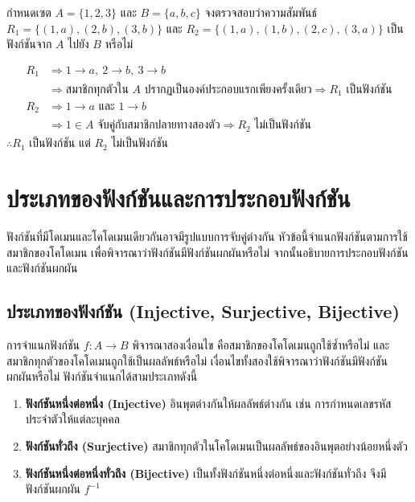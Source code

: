 \begin{ex}
\label{ex:function-check}
กำหนดเซต $A=\{1,2,3\}$ และ $B=\{a,b,c\}$ จงตรวจสอบว่าความสัมพันธ์ $R_1=\{(1,a),(2,b),(3,b)\}$ และ $R_2=\{(1,a),(1,b),(2,c),(3,a)\}$ เป็นฟังก์ชันจาก $A$ ไปยัง $B$ หรือไม่
\end{ex}
\begin{solution}
\begin{align*}
R_1 &\Rightarrow 1 \to a,\ 2 \to b,\ 3 \to b\\
&\Rightarrow \text{สมาชิกทุกตัวใน } A \text{ ปรากฏเป็นองค์ประกอบแรกเพียงครั้งเดียว} \Rightarrow R_1 \text{ เป็นฟังก์ชัน}\\
R_2 &\Rightarrow 1 \to a \text{ และ } 1 \to b\\
&\Rightarrow 1 \in A \text{ จับคู่กับสมาชิกปลายทางสองตัว} \Rightarrow R_2 \text{ ไม่เป็นฟังก์ชัน}
\end{align*}
$\therefore R_1$ เป็นฟังก์ชัน แต่ $R_2$ ไม่เป็นฟังก์ชัน \solhere
\end{solution}

\section{ประเภทของฟังก์ชันและการประกอบฟังก์ชัน}
\label{sec:function-types}

ฟังก์ชันที่มีโดเมนและโคโดเมนเดียวกันอาจมีรูปแบบการจับคู่ต่างกัน หัวข้อนี้จำแนกฟังก์ชันตามการใช้สมาชิกของโคโดเมน เพื่อพิจารณาว่าฟังก์ชันมีฟังก์ชันผกผันหรือไม่ จากนั้นอธิบายการประกอบฟังก์ชันและฟังก์ชันผกผัน~\parencite{lipschutz2009discrete}

\subsection{ประเภทของฟังก์ชัน (Injective, Surjective, Bijective)}
\label{subsec:function-types-detail}

การจำแนกฟังก์ชัน $f: A \to B$ พิจารณาสองเงื่อนไข คือสมาชิกของโคโดเมนถูกใช้ซ้ำหรือไม่ และสมาชิกทุกตัวของโคโดเมนถูกใช้เป็นผลลัพธ์หรือไม่ เงื่อนไขทั้งสองใช้พิจารณาว่าฟังก์ชันมีฟังก์ชันผกผันหรือไม่ ฟังก์ชันจำแนกได้สามประเภทดังนี้~\parencite{rosen2019discrete}
\begin{enumerate}[label=\textbf{\arabic*.}]
    \item \textbf{ฟังก์ชันหนึ่งต่อหนึ่ง (Injective)} อินพุตต่างกันให้ผลลัพธ์ต่างกัน เช่น การกำหนดเลขรหัสประจำตัวให้แต่ละบุคคล
    \item \textbf{ฟังก์ชันทั่วถึง (Surjective)} สมาชิกทุกตัวในโคโดเมนเป็นผลลัพธ์ของอินพุตอย่างน้อยหนึ่งตัว
    \item \textbf{ฟังก์ชันหนึ่งต่อหนึ่งทั่วถึง (Bijective)} เป็นทั้งฟังก์ชันหนึ่งต่อหนึ่งและฟังก์ชันทั่วถึง จึงมีฟังก์ชันผกผัน $f^{-1}$
\end{enumerate}

